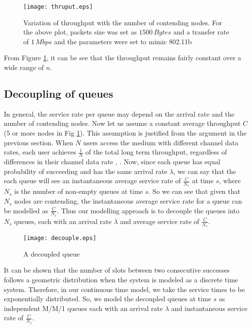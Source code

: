 \documentclass[10pt, conference, compsocconf]{IEEEtran}
\begin{document}
\begin{figure}[h]
\centering
\texttt{[image: thruput.eps]}
\caption {Variation of throughput with the number of contending nodes. For the above plot, packets size was set as $1500\,Bytes$ and a transfer rate of $1\,Mbps$ and the parameters were set to mimic 802.11b}
\label{fig:thruput}
\end{figure}

From Figure \ref{fig:thruput}, it can be see that the throughput remains fairly constant over a wide range of $n$.

\subsection{Decoupling of queues}
In general, the service rate per queue may depend on the arrival rate and the number of contending nodes. Now let us assume a constant average throughput $C$ (5 or more nodes in Fig \ref{fig:thruput}). This assumption is justified from the argument in the previous section.  When $N$ users access the medium with different channel data rates, each user achieves $\frac{1}{N}$ of the total long term throughput, regardless of differences in their channel data rate \cite{hue}, \cite{sad}. Now, since each queue has equal probability of succeeding and has the same arrival rate $\lambda$, we can say that the each queue will see an instantaneous average service rate of $\frac{C}{N_s}$ at time $s$, where $N_s$ is the number of non-empty queues at time $s$. So we can see that given that $N_s$ nodes are contending, the instantaneous average service rate for a queue can be modelled as $\frac{C}{N_s}$. Thus our modelling approach is to decouple the queues into $N_s$ queues, each with an arrival rate $\lambda$ and average service rate of $\frac{C}{N_s}$.

\begin{figure}[h]
\centering
\texttt{[image: decouple.eps]}
\caption {A decoupled queue}
\label{fig:decouple}
\end{figure}

It can be shown that the number of slots between two consecutive successes follows a geometric distribution when the system is modeled as a discrete time system. Therefore, in our continuous time model, we take the service times to be exponentially distributed. So, we model the decoupled queues at time $s$ as independent M/M/1 queues each with an arrival rate $\lambda$ and instantaneous service rate of $\frac{C}{N_s}$.
\end{document}
